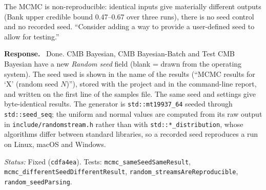 \documentclass[11pt]{article}
\newcommand{\code}[1]{\texttt{#1}}
\newcommand{\commit}[1]{\texttt{#1}}
\newcounter{cmt}
\newcounter{grp}
\renewcommand{\thecmt}{\thegrp.\arabic{cmt}}
\newenvironment{reviewer}[1]{%
  \refstepcounter{cmt}%
  \begin{tcolorbox}[enhanced,breakable,colback=commentbg,colframe=usgsgreen!60,
    boxrule=0.4pt,left=6pt,right=6pt,top=4pt,bottom=4pt,
    title={\small\textbf{Comment \thecmt}\hfill\textit{#1}},
    coltitle=black,colbacktitle=usgsgreen!15,fonttitle=\small]}%
  {\end{tcolorbox}}
\newenvironment{response}{\par\noindent\textbf{Response.}\ }{\par\medskip}
\newcommand{\status}[1]{\par\noindent\textit{Status:} #1\par}
\begin{document}
\begin{reviewer}{Email 10/15, item 1; Summary; Tests, Test 1}
The MCMC is non-reproducible: identical inputs give materially different
outputs (Bank upper credible bound 0.47--0.67 over three runs), there is no
seed control and no recorded seed. ``Consider adding a way to provide a
user-defined seed to allow for testing.''
\end{reviewer}
\begin{response}
Done. CMB Bayesian, CMB Bayesian-Batch and Test CMB Bayesian have a new
\emph{Random seed} field (blank = drawn from the operating system). The seed
used is shown in the name of the results (``MCMC results for `X' (random
seed $N$)''), stored with the project and in the command-line report, and
written on the first line of the samples file. The same seed and settings
give byte-identical results. The generator is \code{std::\allowbreak{}mt19937\_\allowbreak{}64} seeded
through \code{std::\allowbreak{}seed\_\allowbreak{}seq}; the uniform and normal values are computed
from its raw output in \code{include/\allowbreak{}randomstream.\allowbreak{}h} rather than with
\code{std::\allowbreak{}*\_\allowbreak{}distribution}, whose algorithms differ between standard
libraries, so a recorded seed reproduces a run on Linux, macOS and Windows.
\end{response}
\status{Fixed (\commit{cdfa4ea}). Tests: \code{mcmc\_\allowbreak{}sameSeedSameResult},
\code{mcmc\_\allowbreak{}differentSeedDifferentResult}, \code{random\_\allowbreak{}streamsAreReproducible}, \code{random\_\allowbreak{}seedParsing}.}
\end{document}
